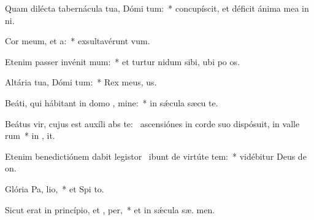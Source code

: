 \item Quam dilécta tabernácula tua, Dómi tum:~* concupíscit, et déficit ánima mea in  ni.
\item Cor meum, et  a:~* exsultavérunt   vum.
\item Etenim passer invénit  mum:~* et turtur nidum sibi, ubi po  os.
\item Altária tua, Dómi tum:~* Rex meus,   us.
\item Beáti, qui hábitant in domo , mine:~* in sǽcula sæcu  te.
\item Beátus vir, cujus est auxíli abs te:~\pscross{} ascensiónes in corde suo dispósuit, in valle rum~* in ,  it.
\item Etenim benedictiónem dabit legistor~\pscross{} ibunt de virtúte  tem:~* vidébitur Deus de  on.
\item Glória Pa,  lio,~* et Spi to.
\item Sicut erat in princípio, et ,  per,~* et in sǽcula sæ. men.
